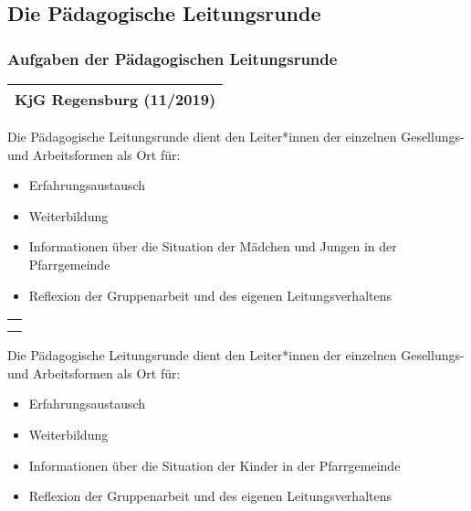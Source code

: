 \documentclass[12pt]{report}
\newcounter{tablecounter}
\newcommand\showcounter{\addtocounter{tablecounter}{1}\thetablecounter}
\begin{document}
\begin{flushleft}
\subsection{Die Pädagogische Leitungsrunde}
\subsubsection{Aufgaben der Pädagogischen Leitungsrunde}
\begin{table}[H]
 \begin{tabular}{|l|}
  \hline
  \rowcolor[HTML]{FFCC67} 
  \rule[-1ex]{0pt}{4ex} \textbf{KjG Regensburg (11/2019)}     \hspace{0.6\textwidth} \showcounter        \\ \hline
 \end{tabular}
\end{table}

Die Pädagogische Leitungsrunde dient den Leiter*innen der einzelnen Gesellungs- und Arbeitsformen als Ort für:
\begin{itemize}
  \item Erfahrungsaustausch
  \item Weiterbildung
  \item Informationen über die Situation der Mädchen und Jungen in der Pfarrgemeinde
  \item Reflexion der Gruppenarbeit und des eigenen Leitungsverhaltens
\end{itemize}

\begin{table}[H]
 \begin{tabular}{|l|}
  \hline
  \rowcolor[HTML]{9AFF99} 
  \rule[-1ex]{0pt}{4ex}
  \begin{minipage}[t]{\textwidth}
   \textbf{Änderung:\\}  
    \end{minipage}
  \\ \hline
 \end{tabular}
\end{table}
Die Pädagogische Leitungsrunde dient den Leiter*innen der einzelnen Gesellungs- und Arbeitsformen als Ort für:
\begin{itemize}
  \item Erfahrungsaustausch
  \item Weiterbildung
  \item Informationen über die Situation der {\color{red} Kinder} in der Pfarrgemeinde
  \item Reflexion der Gruppenarbeit und des eigenen Leitungsverhaltens
\end{itemize}


\end{flushleft}
\end{document}
